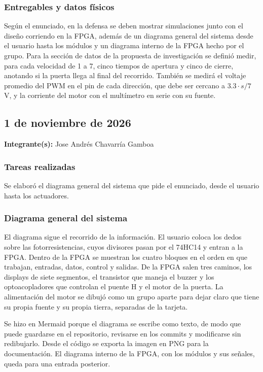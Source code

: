 \documentclass[11pt,letterpaper]{article}
\newcommand{\entrada}[2]{%
  \subsection*{#1}%
  \addcontentsline{toc}{subsection}{#1}%
  \noindent\textbf{Integrante(s):} #2\par\medskip
}
\begin{document}
\subsubsection*{Entregables y datos físicos}

Según el enunciado, en la defensa se deben mostrar simulaciones junto con el diseño corriendo en la FPGA, además de un diagrama general del sistema desde el usuario hasta los módulos y un diagrama interno de la FPGA hecho por el grupo. Para la sección de datos de la propuesta de investigación se definió medir, para cada velocidad de 1 a 7, cinco tiempos de apertura y cinco de cierre, anotando si la puerta llega al final del recorrido. También se medirá el voltaje promedio del PWM en el pin de cada dirección, que debe ser cercano a $3.3 \cdot s / 7$ V, y la corriente del motor con el multímetro en serie con su fuente.


\entrada{1 de noviembre de 2026}{Jose Andrés Chavarría Gamboa}

\subsubsection*{Tareas realizadas}

Se elaboró el diagrama general del sistema que pide el enunciado, desde el usuario hasta los actuadores.

\subsubsection*{Diagrama general del sistema}

El diagrama sigue el recorrido de la información. El usuario coloca los dedos sobre las fotorresistencias, cuyos divisores pasan por el 74HC14 y entran a la FPGA. Dentro de la FPGA se muestran los cuatro bloques en el orden en que trabajan, entradas, datos, control y salidas. De la FPGA salen tres caminos, los displays de siete segmentos, el transistor que maneja el buzzer y los optoacopladores que controlan el puente H y el motor de la puerta. La alimentación del motor se dibujó como un grupo aparte para dejar claro que tiene su propia fuente y su propia tierra, separadas de la tarjeta.

Se hizo en Mermaid porque el diagrama se escribe como texto, de modo que puede guardarse en el repositorio, revisarse en los commits y modificarse sin redibujarlo. Desde el código se exporta la imagen en PNG para la documentación. El diagrama interno de la FPGA, con los módulos y sus señales, queda para una entrada posterior.
\end{document}
